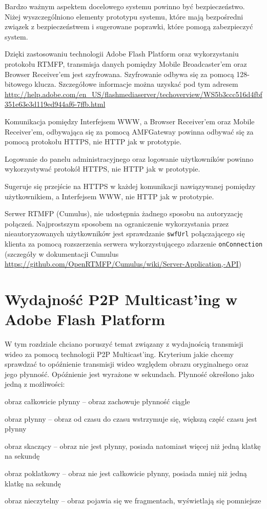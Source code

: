 Bardzo ważnym aspektem docelowego systemu powinno być bezpieczeństwo. Niżej wyszczególniono elementy prototypu systemu, które mają bezpośredni związek z bezpieczeństwem i sugerowane poprawki, które pomogą zabezpieczyć system.

\begin{packed_item}
    \item{Dzięki zastosowaniu technologii Adobe Flash Platform oraz wykorzystaniu protokołu RTMFP, transmisja danych pomiędzy Mobile Broadcaster'em oraz Browser Receiver'em jest szyfrowana. Szyfrowanie odbywa się za pomocą 128-bitowego klucza. Szczegółowe informacje można uzyskać pod tym adresem \url{http://help.adobe.com/en_US/flashmediaserver/techoverview/WS5b3ccc516d4fbf351e63e3d119ed944af6-7ffb.html}}
    \item{Komunikacja pomiędzy Interfejsem WWW, a Browser Receiver'em oraz Mobile Receiver'em, odbywająca się za pomocą AMFGateway powinna odbywać się za pomocą protokołu HTTPS, nie HTTP jak w prototypie.}
    \item{Logowanie do panelu administracyjnego oraz logowanie użytkowników powinno wykorzystywać protokół HTTPS, nie HTTP jak w prototypie.}
    \item{Sugeruje się przejście na HTTPS w każdej komunikacji nawiązywanej pomiędzy użytkownikiem, a Interfejsem WWW, nie HTTP jak w prototypie.}
    \item{Serwer RTMFP (Cumulus), nie udostępnia żadnego sposobu na autoryzację połączeń. Najprostszym sposobem na ograniczenie wykorzystania przez nieautoryzowanych użytkowników jest sprawdzanie \texttt{swfUrl} połączającego się klienta za pomocą rozszerzenia serwera wykorzystującego zdarzenie \texttt{onConnection} (szczegóły w dokumentacji Cumulus \url{https://github.com/OpenRTMFP/Cumulus/wiki/Server-Application,-API})}
\end{packed_item}

\newpage
\section{Wydajność P2P Multicast'ing w Adobe Flash Platform}

W tym rozdziale chciano poruszyć temat związany z wydajnością transmisji wideo za pomocą technologii P2P Multicast'ing. Kryterium jakie chcemy sprawdzać to opóźnienie transmisji wideo względem obrazu oryginalnego oraz jego płynność. Opóźnienie jest wyrażone w sekundach. Płynność określono jako jedną z możliwości:
\begin{packed_item}
    \item{obraz całkowicie płynny -- obraz zachowuje płynność ciągle}
    \item{obraz płynny -- obraz od czasu do czasu wstrzymuje się, większą część czasu jest płynny}
    \item{obraz skaczący -- obraz nie jest płynny, posiada natomiast więcej niż jedną klatkę na sekundę}
    \item{obraz poklatkowy -- obraz nie jest całkowicie płynny, posiada mniej niż jedną klatkę na sekundę}
    \item{obraz nieczytelny -- obraz pojawia się we fragmentach, wyświetlają się pomniejsze}
\end{packed_item}

